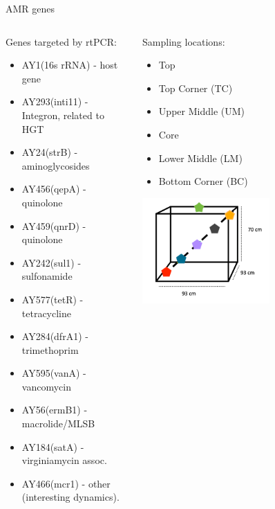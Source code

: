 \documentclass[mathserif,11pt]{beamer}
\begin{document}
\begin{frame}{AMR genes}
\begin{columns}
\begin{column}{0.5\textwidth}
	Genes targeted by rtPCR:
\scriptsize
\begin{itemize}
	\item AY1(16s rRNA) - host gene
	\item AY293(inti11) - Integron, related to HGT
	\item AY24(strB) - aminoglycosides
	\item AY456(qepA) - quinolone
	\item AY459(qnrD) - quinolone
	\item AY242(sul1) - sulfonamide
	\item AY577(tetR) - tetracycline
	\item AY284(dfrA1) - trimethoprim
	\item AY595(vanA) - vancomycin
	\item AY56(ermB1) - macrolide/MLSB
	\item AY184(satA)  - virginiamycin assoc.
	\item AY466(mcr1) - other (interesting dynamics).
\end{itemize}
\end{column}
\begin{column}{0.5\textwidth}
	Sampling locations:
	\begin{itemize}
		\item Top
		\item Top Corner (TC)
		\item Upper Middle (UM)
		\item Core
		\item Lower Middle (LM)
		\item Bottom Corner (BC)
	\end{itemize}
		\centering
		\includegraphics[width=0.6\textwidth]{Figures/Colour_coded_probes.png}\\
\end{column}
\end{columns}
\end{frame}
\end{document}
